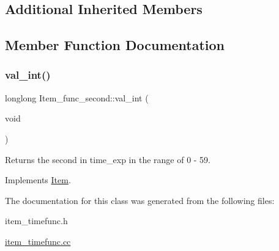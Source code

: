 \subsection*{Additional Inherited Members}


\subsection{Member Function Documentation}
\mbox{\label{classItem__func__second_a3d9ce952332cc1d18fa9528083ae650a}} 
\subsubsection{\texorpdfstring{val\+\_\+int()}{val\_int()}}
{\footnotesize\ttfamily longlong Item\+\_\+func\+\_\+second\+::val\+\_\+int (\begin{DoxyParamCaption}\item[{void}]{ }\end{DoxyParamCaption})\hspace{0.3cm}{\ttfamily [virtual]}}

Returns the second in time\+\_\+exp in the range of 0 -\/ 59. 

Implements \mbox{\hyperlink{classItem}{Item}}.



The documentation for this class was generated from the following files\+:\begin{DoxyCompactItemize}
\item 
item\+\_\+timefunc.\+h\item 
\mbox{\hyperlink{item__timefunc_8cc}{item\+\_\+timefunc.\+cc}}\end{DoxyCompactItemize}
